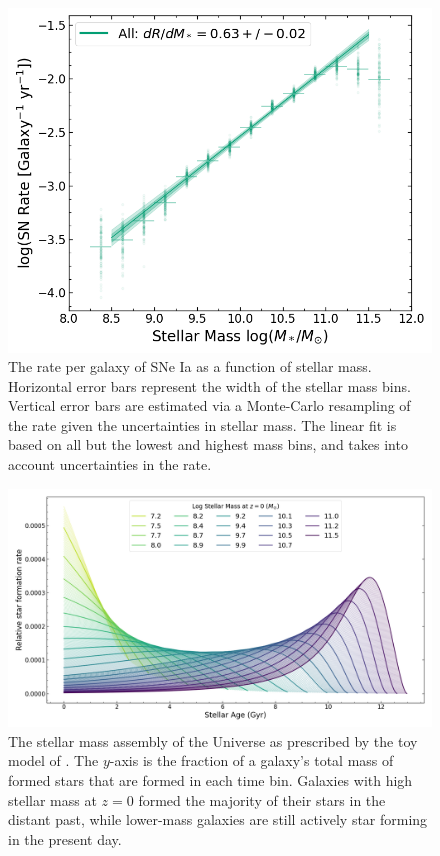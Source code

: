 \documentclass[fleqn,usenatbib]{mnras}
\begin{document}
\begin{figure}
    \centering
    \includegraphics[width=.5\textwidth]{figs/rate_vs_mass_all.png}
    \caption{The rate per galaxy of SNe Ia as a function of stellar mass. Horizontal error bars represent the width of the stellar mass bins. Vertical error bars are estimated via a Monte-Carlo resampling of the rate given the uncertainties in stellar mass. The linear fit is based on all but the lowest and highest mass bins, and takes into account uncertainties in the rate.}%
    \label{fig:rate_raw}
\end{figure}



\begin{figure}
    \centering
    \includegraphics[width=\textwidth]{figs/SFHs_colour.png}
    \caption{The stellar mass assembly of the Universe as prescribed by the toy model of . The $y$-axis is the fraction of a galaxy's total mass of formed stars that are formed in each time bin. Galaxies with high stellar mass at $z=0$ formed the majority of their stars in the distant past, while lower-mass galaxies are still actively star forming in the present day.}
    \label{fig:SFHs}
\end{figure}
\end{document}
